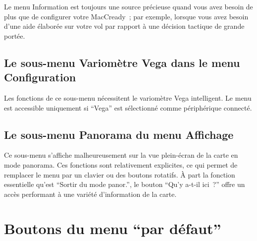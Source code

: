 Le menu Information est toujours une source précieuse quand vous avez besoin de plus
que de configurer votre MacCready~; par exemple, lorsque vous avez besoin d'une aide élaborée sur votre vol
par rapport à une décision tactique de grande portée.

\subsection*{Le sous-menu Variomètre Vega dans le menu Configuration}
\noindent{}

Les fonctions de ce sous-menu nécessitent le variomètre Vega intelligent.
Le menu est accessible uniquement si ``Vega'' est sélectionné comme périphérique connecté.

\subsection*{Le sous-menu Panorama du menu Affichage}

\noindent{}

Ce sous-menu s'affiche malheureusement sur la vue plein-écran de la carte en mode panorama.
Ces fonctions sont relativement explicites, ce qui permet de remplacer le menu par un clavier
ou des boutons rotatifs. À part la fonction essentielle qu'est
``Sortir du mode panor.'', le bouton ``Qu'y a-t-il ici~?'' offre un accès performant à une variété
d'information de la carte.

\section{Boutons du menu ``par défaut''}

